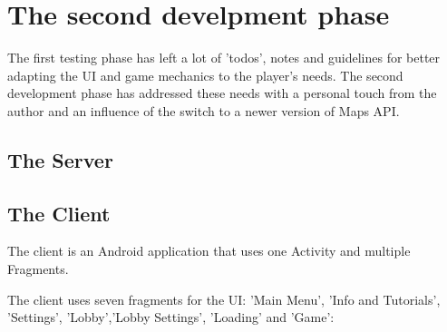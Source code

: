 \documentclass{article}
\begin{document}
\section{The second develpment phase}

The first testing phase has left a lot of 'todos', notes and guidelines for
better adapting the UI and game mechanics to the player's needs. The second
development phase has addressed these needs with a personal touch from the
author and an influence of the switch to a newer version of Maps API.

\subsection{The Server}

\subsection{The Client}

The client is an Android application that uses one Activity and multiple
Fragments. 

The client uses seven fragments for the UI: 'Main Menu', 'Info and
Tutorials', 'Settings', 'Lobby','Lobby Settings', 'Loading' and 'Game':
\end{document}
